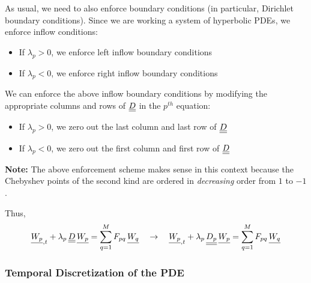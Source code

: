 As usual, we need to also enforce boundary conditions (in particular, Dirichlet boundary conditions).
Since we are working a system of hyperbolic PDEs, we enforce inflow conditions:
\begin{itemize}
    \item If $\lambda_{p} > 0$, we enforce left inflow boundary conditions
    \item If $\lambda_{p} < 0$, we enforce right inflow boundary conditions
\end{itemize}
We can enforce the above inflow boundary conditions by modifying the appropriate columns and rows of ${\underline{\underline{D}}}$ in the $p^{th}$ equation:
\begin{itemize}
    \item If $\lambda_{p} > 0$, we zero out the last column and last row of ${\underline{\underline{D}}}$
    \item If $\lambda_{p} < 0$, we zero out the first column and first row of ${\underline{\underline{D}}}$
\end{itemize}
\textbf{Note:} The above enforcement scheme makes sense in this context because the Chebyshev points of the second kind are ordered in \textit{decreasing} order from $1$ to $-1$.
\par 
Thus,
\begin{align}
    {\underline{W_{p}}}_{, t} + \lambda_{p} \, {\underline{\underline{D}}} \, {\underline{W_{p}}} = \sum_{q=1}^{M} F_{pq} \, {\underline{W_{q}}} \quad \rightarrow \quad
    {\underline{W_{p}}}_{, t} + \lambda_{p} \, {\underline{\underline{D_{p}}}} \, {\underline{W_{p}}} = \sum_{q=1}^{M} F_{pq} \, {\underline{W_{q}}}
\end{align}

\subsubsection{Temporal Discretization of the PDE}

